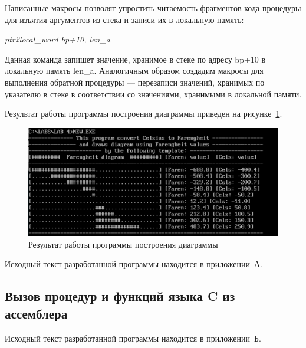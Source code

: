 Написанные макросы позволят упростить читаемость фрагментов кода процедуры
для изъятия аргументов из стека и записи их в локальную память:

\textit{ptr2local\_word bp+10, len\_a}

Данная команда запишет значение, хранимое в стеке по адресу bp+10 в локальную
память len\_a. Аналогичным образом создадим макросы для выполнения обратной
процедуры --- перезаписи значений, хранимых по указателю в стеке в соответствии
со значениями, хранимыми в локальной памяти.

Результат работы программы построения диаграммы приведен на рисунке~\ref{pic:part_1}.
\begin{figure}[h!]
  \centering
  \includegraphics[width=0.8\linewidth]{pic/part_1}
  \caption{Результат работы программы построения диаграммы}
  \label{pic:part_1}
\end{figure}

Исходный текст разработанной программы находится в приложении~А.

\subsection{Вызов процедур и функций языка C из ассемблера}






Исходный текст разработанной программы находится в приложении~Б.

\pagebreak
